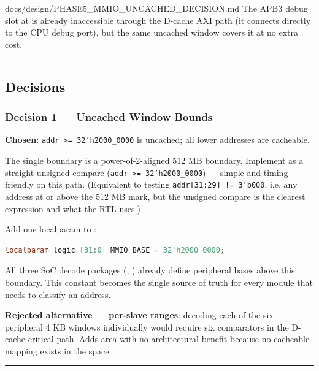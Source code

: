 \begin{relocated}{docs/design/PHASE5_MMIO_UNCACHED_DECISION.md}
The APB3 debug slot at  is already inaccessible
through the D-cache AXI path (it connects directly to the CPU debug
port), but the same uncached window covers it at no extra cost.

\begin{center}\rule{0.5\linewidth}{0.5pt}\end{center}

\subsection{Decisions}\label{ds:dec:phase5-mmio-uncached:3-decisions}

\subsubsection{Decision 1 --- Uncached Window Bounds}\label{ds:dec:phase5-mmio-uncached:decision-1-uncached-window-bounds}

\textbf{Chosen}:
\texttt{addr\ >=\allowbreak{}\ 32'h2000\_\allowbreak{}0000} is uncached;
all lower addresses are cacheable.

The single boundary  is a power-of-2-aligned 512 MB
boundary. Implement as a straight unsigned compare
(\texttt{addr\ >=\allowbreak{}\ 32'h2000\_\allowbreak{}0000}) --- simple
and timing-friendly on this path. (Equivalent to testing
\texttt{addr[31:\allowbreak{}29]\ !=\allowbreak{}\ 3'b000}, i.e. any
address at or above the 512 MB mark, but the unsigned compare is the
clearest expression and what the RTL uses.)

Add one localparam to :

\begin{lstlisting}[language=Verilog]
localparam logic [31:0] MMIO_BASE = 32'h2000_0000;
\end{lstlisting}

All three SoC decode packages (,
) already define peripheral bases above this
boundary. This constant becomes the single source of truth for every
module that needs to classify an address.

\textbf{Rejected alternative --- per-slave ranges}: decoding each of the
six peripheral 4 KB windows individually would require six comparators
in the D-cache critical path. Adds area with no architectural benefit
because no cacheable mapping exists in the  space.

\begin{center}\rule{0.5\linewidth}{0.5pt}\end{center}


\end{relocated}
